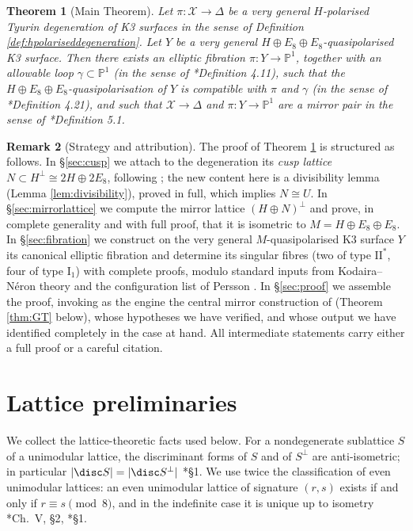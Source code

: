 \documentclass[11pt]{amsart}
\theoremstyle{plain}
\newtheorem{theorem}{Theorem}[section]
\theoremstyle{definition}
\newtheorem{remark}[theorem]{Remark}
\newcommand{\Pn}{\mathbb{P}^1}
\newcommand{\cX}{\mathcal{X}}
\begin{document}
\begin{theorem}[Main Theorem]\label{thm:main}
Let $\pi\colon \cX\to\Delta$ be a very general $H$-polarised Tyurin
degeneration of K3 surfaces in the sense of Definition
\ref{def:hpolariseddegeneration}. Let $Y$ be a very general
$H\oplus E_8\oplus E_8$-quasipolarised K3 surface. Then there exists an
elliptic fibration $\pi\colon Y\to\Pn$, together with an allowable loop
$\gamma\subset\Pn$ (in the sense of \cite{dfk3slpms}*{Definition 4.11}), such
that the $H\oplus E_8\oplus E_8$-quasipolarisation of $Y$ is compatible with
$\pi$ and $\gamma$ (in the sense of \cite{dfk3slpms}*{Definition 4.21}), and
such that $\cX\to\Delta$ and $\pi\colon Y\to\Pn$ are a mirror pair in the sense
of \cite{dfk3slpms}*{Definition 5.1}.
\end{theorem}

\begin{remark}[Strategy and attribution]
The proof of Theorem \ref{thm:main} is structured as follows. In
\S\ref{sec:cusp} we attach to the degeneration its \emph{cusp lattice}
$N\subset H^\perp\cong 2H\oplus 2E_8$, following \cite{Fri83,dfk3slpms}; the
new content here is a divisibility lemma (Lemma \ref{lem:divisibility}), proved
in full, which implies $N\cong U$. In \S\ref{sec:mirrorlattice} we compute the
mirror lattice $(H\oplus N)^\perp$ and prove, in complete generality and with
full proof, that it is isometric to $M=H\oplus E_8\oplus E_8$. In
\S\ref{sec:fibration} we construct on the very general $M$-quasipolarised K3
surface $Y$ its canonical elliptic fibration and determine its singular fibres
(two of type $\mathrm{II}^*$, four of type $\mathrm{I}_1$) with complete proofs,
modulo standard inputs from Kodaira--N\'eron theory
\cite{Kod63,Mir89,SD74,Shi72} and the configuration list of Persson \cite{Per85}.
In \S\ref{sec:proof} we assemble the proof, invoking as the engine the central
mirror construction of \cite{dfk3slpms} (Theorem \ref{thm:GT} below), whose
hypotheses we have verified, and whose output we have identified completely in
the case at hand. All intermediate statements carry either a full proof or a
careful citation.
\end{remark}

\section{Lattice preliminaries}

We collect the lattice-theoretic facts used below. For a nondegenerate
sublattice $S$ of a unimodular lattice, the discriminant forms of $S$ and of
$S^\perp$ are anti-isometric; in particular $|\disc S|=|\disc S^\perp|$
\cite{Nik80}*{\S 1}. We use twice the classification of even unimodular
lattices: an even unimodular lattice of signature $(r,s)$ exists if and only if
$r\equiv s \pmod 8$, and in the indefinite case it is unique up to isometry
\cite{Ser70}*{Ch.~V, \S2}, \cite{Nik80}*{\S1}.
\end{document}
